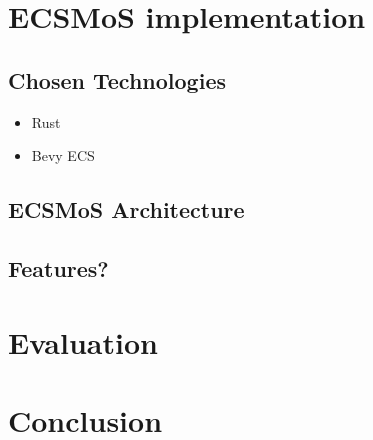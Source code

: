 \documentclass[twoside, 11pt]{article}
\begin{document}
\section{ECSMoS implementation}

\subsection{Chosen Technologies}

\begin{itemize}
  \item Rust
  \item Bevy ECS
\end{itemize}

\subsection{ECSMoS Architecture}
\subsection{Features?}

\section{Evaluation}
\section{Conclusion}
\end{document}
